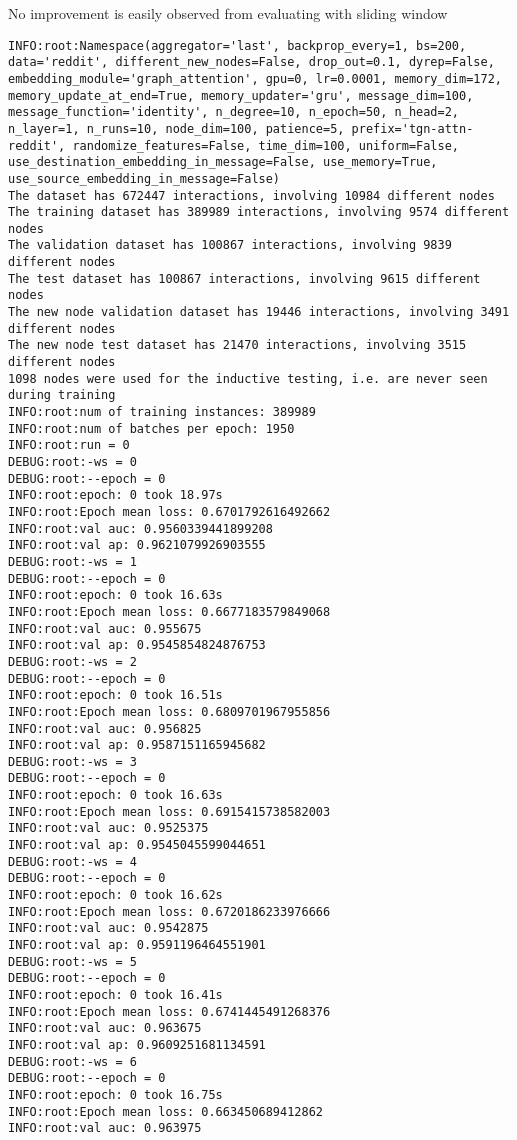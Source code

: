 \documentclass[11pt]{article}
\begin{document}
No improvement is easily observed from evaluating with sliding window
\begin{verbatim}
INFO:root:Namespace(aggregator='last', backprop_every=1, bs=200, data='reddit', different_new_nodes=False, drop_out=0.1, dyrep=False, embedding_module='graph_attention', gpu=0, lr=0.0001, memory_dim=172, memory_update_at_end=True, memory_updater='gru', message_dim=100, message_function='identity', n_degree=10, n_epoch=50, n_head=2, n_layer=1, n_runs=10, node_dim=100, patience=5, prefix='tgn-attn-reddit', randomize_features=False, time_dim=100, uniform=False, use_destination_embedding_in_message=False, use_memory=True, use_source_embedding_in_message=False)
The dataset has 672447 interactions, involving 10984 different nodes
The training dataset has 389989 interactions, involving 9574 different nodes
The validation dataset has 100867 interactions, involving 9839 different nodes
The test dataset has 100867 interactions, involving 9615 different nodes
The new node validation dataset has 19446 interactions, involving 3491 different nodes
The new node test dataset has 21470 interactions, involving 3515 different nodes
1098 nodes were used for the inductive testing, i.e. are never seen during training
INFO:root:num of training instances: 389989
INFO:root:num of batches per epoch: 1950
INFO:root:run = 0
DEBUG:root:-ws = 0
DEBUG:root:--epoch = 0
INFO:root:epoch: 0 took 18.97s
INFO:root:Epoch mean loss: 0.6701792616492662
INFO:root:val auc: 0.9560339441899208
INFO:root:val ap: 0.9621079926903555
DEBUG:root:-ws = 1
DEBUG:root:--epoch = 0
INFO:root:epoch: 0 took 16.63s
INFO:root:Epoch mean loss: 0.6677183579849068
INFO:root:val auc: 0.955675
INFO:root:val ap: 0.9545854824876753
DEBUG:root:-ws = 2
DEBUG:root:--epoch = 0
INFO:root:epoch: 0 took 16.51s
INFO:root:Epoch mean loss: 0.6809701967955856
INFO:root:val auc: 0.956825
INFO:root:val ap: 0.9587151165945682
DEBUG:root:-ws = 3
DEBUG:root:--epoch = 0
INFO:root:epoch: 0 took 16.63s
INFO:root:Epoch mean loss: 0.6915415738582003
INFO:root:val auc: 0.9525375
INFO:root:val ap: 0.9545045599044651
DEBUG:root:-ws = 4
DEBUG:root:--epoch = 0
INFO:root:epoch: 0 took 16.62s
INFO:root:Epoch mean loss: 0.6720186233976666
INFO:root:val auc: 0.9542875
INFO:root:val ap: 0.9591196464551901
DEBUG:root:-ws = 5
DEBUG:root:--epoch = 0
INFO:root:epoch: 0 took 16.41s
INFO:root:Epoch mean loss: 0.6741445491268376
INFO:root:val auc: 0.963675
INFO:root:val ap: 0.9609251681134591
DEBUG:root:-ws = 6
DEBUG:root:--epoch = 0
INFO:root:epoch: 0 took 16.75s
INFO:root:Epoch mean loss: 0.663450689412862
INFO:root:val auc: 0.963975

\end{verbatim}
\end{document}
